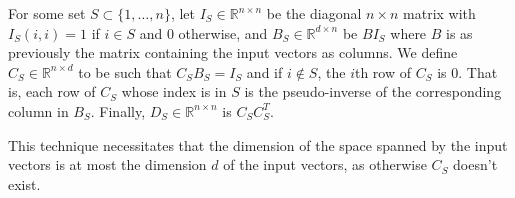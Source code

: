 \documentclass[12pt]{article}
\begin{document}
For some set $S\subset\{1,\dots,n\}$, let $I_S\in\mathbb{R}^{n\times n}$ be the diagonal $n\times n$ matrix with $I_S(i,i) =1$ if $i\in S$ and $0$ otherwise, and $B_S\in\mathbb{R}^{d\times n}$ be $BI_S$ where $B$ is as previously the matrix containing the input vectors as columns. We define $C_S\in\mathbb{R}^{n\times d}$ to be such that $C_SB_S=I_S$ and if $i\not\in S$, the $i$th row of $C_S$ is $0$. That is, each row of $C_S$ whose index is in $S$ is the pseudo-inverse of the corresponding column in $B_S$. Finally, $D_S\in\mathbb{R}^{n\times n}$ is $C_SC_S^T$.

This technique necessitates that the dimension of the space spanned by the input vectors is at most the dimension $d$ of the input vectors, as otherwise $C_S$ doesn't exist. %
\end{document}
